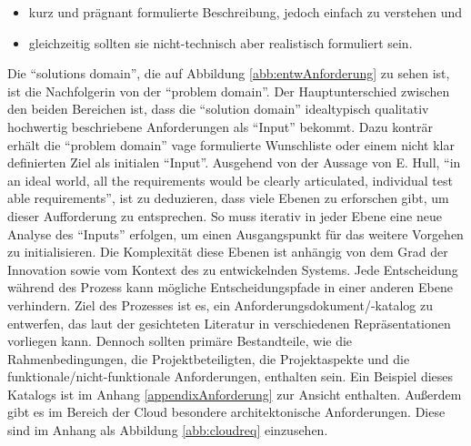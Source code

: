 \begin{itemize}
	\item kurz und prägnant formulierte Beschreibung, jedoch einfach zu verstehen und
	\item gleichzeitig sollten sie nicht-technisch aber realistisch formuliert sein.
\end{itemize}
 
 Die \enquote{solutions domain}, die auf Abbildung \vref{abb:entwAnforderung} zu sehen ist, ist die Nachfolgerin von der \enquote{problem domain}. Der Hauptunterschied zwischen den beiden Bereichen ist, dass die \enquote{solution domain} idealtypisch qualitativ hochwertig beschriebene Anforderungen als \enquote{Input} bekommt. Dazu konträr erhält die \enquote{problem domain} vage formulierte Wunschliste oder einem nicht klar definierten Ziel als initialen \enquote{Input}. Ausgehend von der Aussage von E. Hull, \enquote{in an ideal world, all the requirements would be clearly articulated, individual test able requirements}\autocite[][S.115]{hull_requirements_2011}, ist zu deduzieren, dass viele Ebenen zu erforschen gibt, um dieser Aufforderung zu entsprechen. So muss iterativ in jeder Ebene eine neue Analyse des \enquote{Inputs} erfolgen, um einen Ausgangspunkt für das weitere Vorgehen zu initialisieren. Die Komplexität diese Ebenen ist anhängig von dem Grad der Innovation sowie vom Kontext des zu entwickelnden Systems. Jede Entscheidung während des Prozess kann mögliche Entscheidungspfade in einer anderen Ebene verhindern. Ziel des Prozesses ist es, ein Anforderungsdokument/-katalog zu entwerfen, das laut der gesichteten Literatur in verschiedenen Repräsentationen vorliegen kann. Dennoch sollten primäre Bestandteile, wie die Rahmenbedingungen, die Projektbeteiligten, die Projektaspekte und die funktionale/nicht-funktionale Anforderungen, enthalten sein. Ein Beispiel dieses Katalogs ist im Anhang \vref{appendixAnforderung} zur Ansicht enthalten. Außerdem gibt es im Bereich der Cloud besondere architektonische Anforderungen. Diese sind im Anhang als Abbildung \vref{abb:cloudreq} einzusehen.
 
